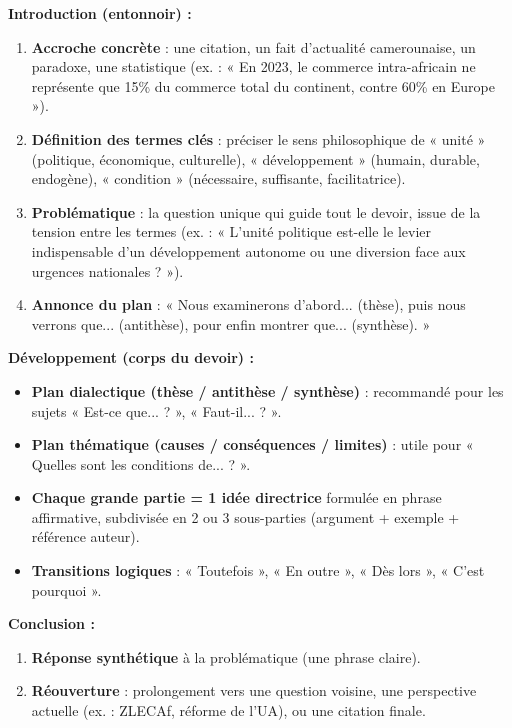 \documentclass[11pt]{article}
\begin{document}
\begin{methode}
\textbf{Introduction (entonnoir) :}
\begin{enumerate}
    \item \textbf{Accroche concrète} : une citation, un fait d'actualité camerounaise, un paradoxe, une statistique (ex. : « En 2023, le commerce intra-africain ne représente que 15\% du commerce total du continent, contre 60\% en Europe »).
    \item \textbf{Définition des termes clés} : préciser le sens philosophique de « unité » (politique, économique, culturelle), « développement » (humain, durable, endogène), « condition » (nécessaire, suffisante, facilitatrice).
    \item \textbf{Problématique} : la question unique qui guide tout le devoir, issue de la tension entre les termes (ex. : « L'unité politique est-elle le levier indispensable d'un développement autonome ou une diversion face aux urgences nationales ? »).
    \item \textbf{Annonce du plan} : « Nous examinerons d'abord... (thèse), puis nous verrons que... (antithèse), pour enfin montrer que... (synthèse). »
\end{enumerate}

\textbf{Développement (corps du devoir) :}
\begin{itemize}
    \item \textbf{Plan dialectique (thèse / antithèse / synthèse)} : recommandé pour les sujets « Est-ce que... ? », « Faut-il... ? ».
    \item \textbf{Plan thématique (causes / conséquences / limites)} : utile pour « Quelles sont les conditions de... ? ».
    \item \textbf{Chaque grande partie = 1 idée directrice} formulée en phrase affirmative, subdivisée en 2 ou 3 sous-parties (argument + exemple + référence auteur).
    \item \textbf{Transitions logiques} : « Toutefois », « En outre », « Dès lors », « C'est pourquoi ».
\end{itemize}

\textbf{Conclusion :}
\begin{enumerate}
    \item \textbf{Réponse synthétique} à la problématique (une phrase claire).
    \item \textbf{Réouverture} : prolongement vers une question voisine, une perspective actuelle (ex. : ZLECAf, réforme de l'UA), ou une citation finale.
\end{enumerate}
\end{methode}
\end{document}
